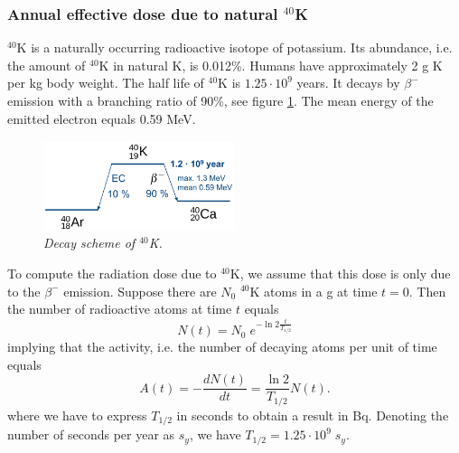 \documentclass[11pt,oneside]{article}
\begin{document}
\subsubsection{Annual effective dose due to natural $^{40}$K}
$^{40}$K is a naturally occurring radioactive isotope of potassium.
Its abundance, i.e. the amount of $^{40}$K in natural K, is 0.012\%.
Humans have approximately 2 g K per kg body weight. The half life of
$^{40}$K is $1.25 \cdot 10^9$ years. It decays by $\beta^-$ emission
with a branching ratio of 90\%, see figure \ref{fig:40Kdecay}. The
mean energy of the emitted electron equals 0.59 MeV.
\begin{figure}[htb]
  \includegraphics[width=0.5\textwidth]{figs/fig_40K_decay.png}
  \centering
  \caption{\label{fig:40Kdecay}
  \emph{Decay scheme of $^{40}$K.}}
\end{figure}

To compute the radiation dose due to $^{40}$K, we assume that this
dose is only due to the $\beta^-$ emission.  Suppose there are $N_0$
$^{40}$K atoms in a g at time $t = 0$. Then the number of radioactive
atoms at time $t$ equals
\begin{equation}
  N(t) = N_0 \; e^{- \ln 2 \frac{t}{T_{1/2}}}
\end{equation}
implying that the activity, i.e. the number of decaying atoms per unit of
time equals
\begin{equation}
  A(t) = - \frac{dN(t)}{dt} = \frac{\ln 2}{T_{1/2}} N(t).
\end{equation}
where we have to express $T_{1/2}$ in seconds to obtain a result in
Bq. Denoting the number of seconds per year as $s_y$, we have
$T_{1/2} = 1.25 \cdot 10^9 \; s_y$.
\end{document}

